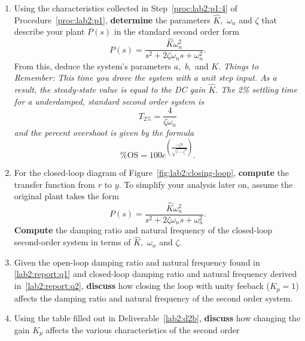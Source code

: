 \begin{deliverable}[label={lab2:report}]
  \begin{enumerate}[label={(\arabic*)}]
    \item{
      Using the characteristics collected in Step~\ref{proc:lab2:p1:4} of
      Procedure~\ref{proc:lab2:p1}, \textbf{determine} the parameters
      \(\hat{K},\) \(\omega_n\) and \(\zeta\) that describe your plant \(P(s)\)
      in the standard second order form
      \[
        P(s) = \frac{\hat{K} \omega_n^2}{s^2 + 2 \zeta \omega_n s + \omega_n^2}
        .
      \]
      From this, deduce the system's parameters \(a,\) \(b,\) and \(K.\)
      \emph{Things to Remember: This time you drove the system with a unit
      step input. As a result, the steady-state value is equal to the DC gain
      \(\hat{K}.\) The 2\% settling time for a underdamped, standard second
      order system is
      \[
        T_{2\%} = \frac{4}{\zeta \omega_n}
      \]
      and the percent overshoot is given by the formula
      \[
        \%\mathrm{OS} = 100 e^{\left(
          \frac{-\zeta \pi}{\sqrt{1-\zeta^2}}
        \right)}.
      \]
      }
      \label{lab2:report:q1}
    }
    \item{
      For the closed-loop diagram of Figure~\ref{fig:lab2:closing-loop},
      \textbf{compute} the transfer function from \(r\) to \(y.\)
      To simplify your analysis later on, assume the original plant takes
      the form
      \[
        P(s) = \frac{\hat{K} \omega_n^2}{s^2 + 2 \zeta \omega_n s +\omega_n^2}.
      \]
      \textbf{Compute} the damping ratio and natural frequency of the
      closed-loop second-order system in terms of \(\hat{K},\) \(\omega_n\)
      and \(\zeta.\)
      \label{lab2:report:q2}
    }
    \item{
      Given the open-loop damping ratio and natural frequency found in
      \ref{lab2:report:q1} and closed-loop damping ratio and natural
      frequency derived in~\ref{lab2:report:q2},
      \textbf{discuss} how closing the loop with unity feeback (\(K_p = 1\))
      affects the damping ratio and natural frequency of the
      second order system.
      \label{lab2:report:q3}
    }
    \item{
      Using the table filled out in Deliverable~\ref{lab2:d2b},
      \textbf{discuss} how changing the
      gain \(K_p\) affects the various characteristics of the second order
}
\end{enumerate}
\end{deliverable}
